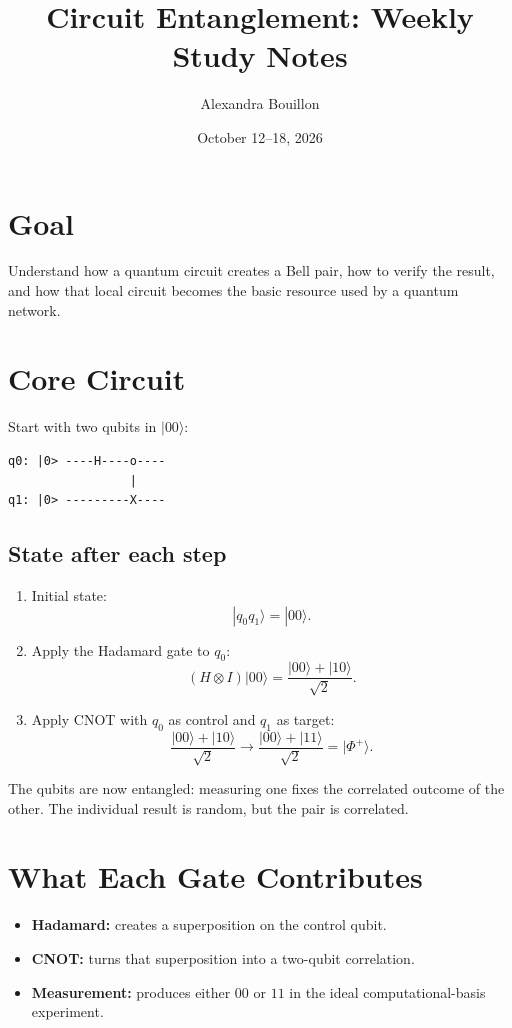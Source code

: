 \documentclass[11pt]{article}
\title{Circuit Entanglement: Weekly Study Notes}
\author{Alexandra Bouillon}
\date{October 12--18, 2026}
\begin{document}
\maketitle

\section{Goal}

Understand how a quantum circuit creates a Bell pair, how to verify the result, and how that local circuit becomes the basic resource used by a quantum network.

\section{Core Circuit}

Start with two qubits in \( |00\rangle \):

\begin{verbatim}
q0: |0> ----H----o----
                 |
q1: |0> ---------X----
\end{verbatim}

\subsection{State after each step}

\begin{enumerate}
    \item Initial state:
    \[
    |q_0q_1\rangle=|00\rangle.
    \]

    \item Apply the Hadamard gate to \(q_0\):
    \[
    (H\otimes I)|00\rangle
    =\frac{|00\rangle+|10\rangle}{\sqrt{2}}.
    \]

    \item Apply CNOT with \(q_0\) as control and \(q_1\) as target:
    \[
    \frac{|00\rangle+|10\rangle}{\sqrt{2}}
    \longrightarrow
    \frac{|00\rangle+|11\rangle}{\sqrt{2}}
    =|\Phi^+\rangle.
    \]
\end{enumerate}

The qubits are now entangled: measuring one fixes the correlated outcome of the other. The individual result is random, but the pair is correlated.

\section{What Each Gate Contributes}

\begin{itemize}
    \item \textbf{Hadamard:} creates a superposition on the control qubit.
    \item \textbf{CNOT:} turns that superposition into a two-qubit correlation.
    \item \textbf{Measurement:} produces either \(00\) or \(11\) in the ideal computational-basis experiment.
\end{itemize}
\end{document}
